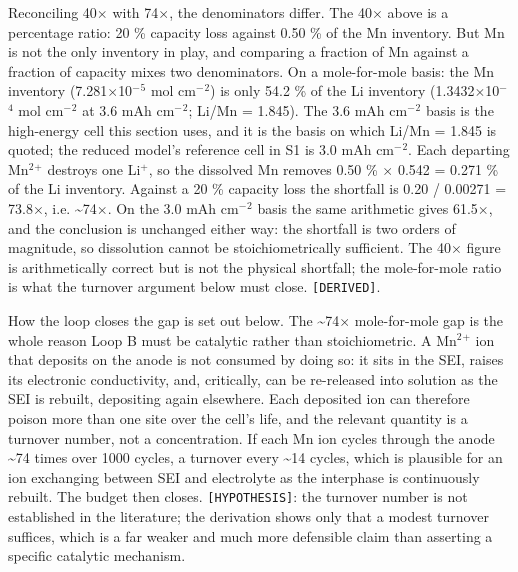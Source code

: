\documentclass[11pt,a4paper]{article}
\begin{document}
Reconciling 40\ensuremath{\times} with 74\ensuremath{\times}, the denominators differ. The 40\ensuremath{\times} above is a percentage ratio: 20 \% capacity loss against 0.50 \% of the Mn inventory. But Mn is not the only inventory in play, and comparing a fraction of Mn against a fraction of capacity mixes two denominators. On a mole-for-mole basis: the Mn inventory (7.281\ensuremath{\times}10\ensuremath{^{-}}\ensuremath{^{5}} mol cm\ensuremath{^{-}}\ensuremath{^{2}}) is only 54.2 \% of the Li inventory (1.3432\ensuremath{\times}10\ensuremath{^{-}}\ensuremath{^{4}} mol cm\ensuremath{^{-}}\ensuremath{^{2}} at 3.6 mAh cm\ensuremath{^{-}}\ensuremath{^{2}}; Li/Mn = 1.845). The 3.6 mAh cm\ensuremath{^{-}}\ensuremath{^{2}} basis is the high-energy cell this section uses, and it is the basis on which Li/Mn = 1.845 is quoted; the reduced model's reference cell in S1 is 3.0 mAh cm\ensuremath{^{-}}\ensuremath{^{2}}. Each departing Mn\ensuremath{^{2}}\ensuremath{^{+}} destroys one Li\ensuremath{^{+}}, so the dissolved Mn removes 0.50 \% \ensuremath{\times} 0.542 = 0.271 \% of the Li inventory. Against a 20 \% capacity loss the shortfall is 0.20 / 0.00271 = 73.8\ensuremath{\times}, i.e. \textasciitilde{}74\ensuremath{\times}. On the 3.0 mAh cm\ensuremath{^{-}}\ensuremath{^{2}} basis the same arithmetic gives 61.5\ensuremath{\times}, and the conclusion is unchanged either way: the shortfall is two orders of magnitude, so dissolution cannot be stoichiometrically sufficient. The 40\ensuremath{\times} figure is arithmetically correct but is not the physical shortfall; the mole-for-mole ratio is what the turnover argument below must close. \texttt{[DERIVED]}.


How the loop closes the gap is set out below. The \textasciitilde{}74\ensuremath{\times} mole-for-mole gap is the whole reason Loop B must be catalytic rather than stoichiometric. A Mn\ensuremath{^{2}}\ensuremath{^{+}} ion that deposits on the anode is not consumed by doing so: it sits in the SEI, raises its electronic conductivity, and, critically, can be re-released into solution as the SEI is rebuilt, depositing again elsewhere. Each deposited ion can therefore poison more than one site over the cell's life, and the relevant quantity is a turnover number, not a concentration. If each Mn ion cycles through the anode \textasciitilde{}74 times over 1000 cycles, a turnover every \textasciitilde{}14 cycles, which is plausible for an ion exchanging between SEI and electrolyte as the interphase is continuously rebuilt. The budget then closes. \texttt{[HYPOTHESIS]}: the turnover number is not established in the literature; the derivation shows only that a modest turnover suffices, which is a far weaker and much more defensible claim than asserting a specific catalytic mechanism.
\end{document}
